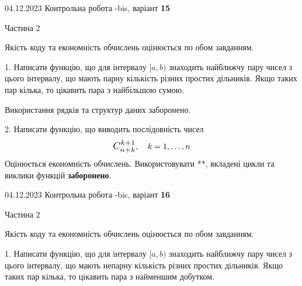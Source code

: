 \documentclass[12pt, ukrainian]{article}
\begin{document}
{{{{{{{{{{{{{{%
\begin {Huge}
{{04.12.2023 Контрольна робота -bis, варіант  \No \textbf { 15 }\par}}

\begin{center}Частина 2
\end{center}
\vspace{10mm}
\end {Huge}

{
\begin {Large}
Якість коду та економність обчислень оцінюється по обом завданням. 

\vspace{5mm}

1. Написати функцію, що для інтервалу $[a, b)$ знаходить найближчу пару чисел з цього інтервалу, що мають парну кількість різних простих дільників. Якщо таких пар кілька, то цікавить пара з найбільшою сумою.

 Використання рядків та структур даних заборонено. 



\vspace{10mm}



2. 
Написати функцію, що виводить послідовність чисел
$$\scalebox{1.2}{$C_{n+k}^{k+1}$}, \quad k=1,\ldots,n$$
Оцінюється економність обчислень. Використовувати **, вкладені цикли та виклики функцій \textbf{заборонено}.

\end{Large}\newpage




\begin {Huge}
{{04.12.2023 Контрольна робота -bis, варіант  \No \textbf { 16 }\par}}

\begin{center}Частина 2
\end{center}
\vspace{10mm}
\end {Huge}

{
\begin {Large}
Якість коду та економність обчислень оцінюється по обом завданням. 

\vspace{5mm}

1. Написати функцію, що для інтервалу $[a, b)$ знаходить найближчу пару чисел з цього інтервалу, що мають непарну кількість різних простих дільників. Якщо таких пар кілька, то цікавить пара з найменшим добутком.


\end{Large}}}}}}}}}}}}}}}}}
\end{document}
